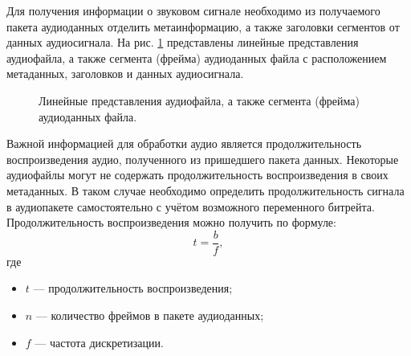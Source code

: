         \par Для получения информации о звуковом сигнале необходимо из получаемого пакета аудиоданных отделить 
        метаинформацию, а также заголовки сегментов от данных аудиосигнала. 
        На рис. \ref{fig:audiofile-line} представлены линейные представления аудиофайла,
        а также сегмента (фрейма) аудиоданных файла с расположением метаданных, заголовков и данных аудиосигнала.
        
        \begin{figure}[!h]
            \caption{Линейные представления аудиофайла, а также сегмента (фрейма) аудиоданных файла.}
            \label{fig:audiofile-line}
        \end{figure}

        \par Важной информацией для обработки аудио является продолжительность воспроизведения аудио, 
        полученного из пришедшего пакета данных.
        Некоторые аудиофайлы могут не содержать продолжительность воспроизведения в своих метаданных. 
        В таком случае необходимо определить продолжительность сигнала в аудиопакете самостоятельно с учётом возможного переменного битрейта.
        Продолжительность воспроизведения можно получить по формуле:
        $$ t = \frac{b}{f},$$
        где
        \begin{itemize}
            \item[] $t$ --- продолжительность воспроизведения;
            \item[] $n$ --- количество фреймов в пакете аудиоданных;
            \item[] $f$ --- частота дискретизации.
        \end{itemize}

